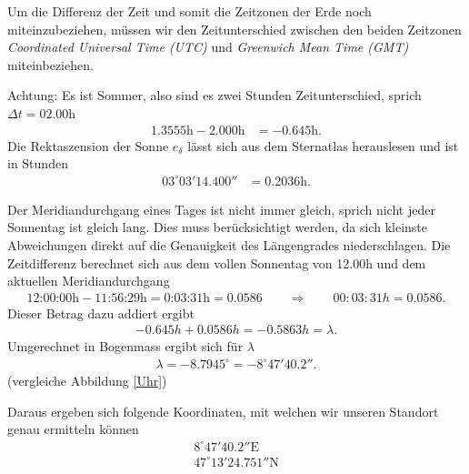 \begin{refsection}
Um die Differenz der Zeit und somit die Zeitzonen der Erde noch miteinzubeziehen, müssen wir den Zeitunterschied zwischen den beiden Zeitzonen {\em Coordinated Universal Time (UTC)} und {\em Greenwich Mean Time (GMT)} miteinbeziehen.

Achtung: Es ist Sommer, also sind es zwei Stunden Zeitunterschied, sprich $\Delta{t}=02.00$h
\begin{align*}
1.3555 \text{h} - 2.000 \text{h} &= -0.645 \text{h}.
\end{align*}
Die Rektaszension der Sonne $e_\delta$ lässt sich aus dem Sternatlas herauslesen und ist in Stunden
\begin{align*}
03^{\circ} 03' 14.400'' &= 0.2036 \text{h}.
\end{align*}

Der Meridiandurchgang eines Tages ist nicht immer gleich, sprich
nicht jeder Sonnentag ist gleich lang. Dies muss berücksichtigt
werden, da sich kleinste Abweichungen direkt auf die Genauigkeit
des Längengrades niederschlagen.
Die Zeitdifferenz berechnet sich aus dem vollen Sonnentag von 12.00h
und dem aktuellen Meridiandurchgang
\begin{align*}
\text{12:00:00h} - \text{11:56:29h} = \text{0:03:31h} = 0.0586
\qquad \Rightarrow \qquad
00:03:31h = 0.0586.
\end{align*}
Dieser Betrag dazu addiert ergibt
\begin{align*}
-0.645 h + 0.0586 h = - 0.5863 h = \lambda.
\end{align*}
Umgerechnet in Bogenmass ergibt sich für $\lambda$
\begin{align*}
\lambda = - 8.7945^{\circ} = -8^{\circ} 47' 40.2''.
\end{align*}
(vergleiche Abbildung \ref{Uhr})

Daraus ergeben sich folgende Koordinaten, mit welchen wir unseren
Standort genau ermitteln können
\begin{align*}
8^{\circ}  47'  40.2'' \text{E} \\
47^{\circ}  13'  24.751'' \text{N}
\end{align*}




\printbibliography[heading=subbibliography]
\end{refsection}







